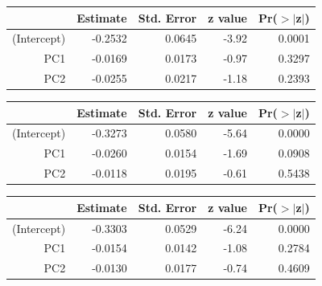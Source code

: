 \documentclass[a4paper,12pt]{Latex/Classes/PhDthesisPSnPDF}
\begin{document}
\newpage

\begin{center}
\begin{table}[ht]
\centering
\begin{tabular}{rrrrr}
  \hline
 & Estimate & Std. Error & z value & Pr($>$$|$z$|$) \\ 
  \hline
(Intercept) & -0.2532 & 0.0645 & -3.92 & 0.0001 \\ 
  PC1 & -0.0169 & 0.0173 & -0.97 & 0.3297 \\ 
  PC2 & -0.0255 & 0.0217 & -1.18 & 0.2393 \\ 
   \hline
\end{tabular}
\end{table}\end{center}

\begin{center}
\begin{table}[ht]
\centering
\begin{tabular}{rrrrr}
  \hline
 & Estimate & Std. Error & z value & Pr($>$$|$z$|$) \\ 
  \hline
(Intercept) & -0.3273 & 0.0580 & -5.64 & 0.0000 \\ 
  PC1 & -0.0260 & 0.0154 & -1.69 & 0.0908 \\ 
  PC2 & -0.0118 & 0.0195 & -0.61 & 0.5438 \\ 
   \hline
\end{tabular}
\end{table}\end{center}

\begin{center}
\begin{table}[ht]
\centering
\begin{tabular}{rrrrr}
  \hline
 & Estimate & Std. Error & z value & Pr($>$$|$z$|$) \\ 
  \hline
(Intercept) & -0.3303 & 0.0529 & -6.24 & 0.0000 \\ 
  PC1 & -0.0154 & 0.0142 & -1.08 & 0.2784 \\ 
  PC2 & -0.0130 & 0.0177 & -0.74 & 0.4609 \\ 
   \hline
\end{tabular}
\end{table}\end{center}
\end{document}
